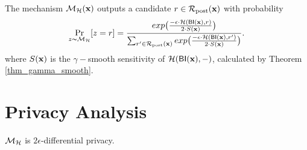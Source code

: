 \documentclass{article}
\begin{document}
\begin{definition}
\label{def_smoo}
The mechanism $\mathcal{M}_{\mathcal{H}}(\textbf{x})$ outputs a candidate $r \in \mathcal{R}_{\textup{post}}(\textbf{x})$ with probability
\begin{equation*}
\underset{z \thicksim \mathcal{M}_{\mathcal{H}}}{\Pr}[z=r] = \frac {exp\big(\frac{-\epsilon\cdot\mathcal{H}(\mathsf{BI}(\textbf{x}),r)}{2\cdot S(\textbf{x})}\big)}
{\sum_{r'\in \mathcal{R}_{\textup{post}}(\textbf{x})} exp \big(\frac{-\epsilon\cdot \mathcal{H} (\mathsf{BI}(\textbf{x}),r')}{2 \cdot S(\textbf{x})}\big)}.
\end{equation*}
where $S(\textbf{x})$ is the $\gamma -$smooth sensitivity of $\mathcal{H}(\mathsf{BI}(\textbf{x}),-)$, calculated by Theorem \ref{thm_gamma_smooth}.
\end{definition}

\section{Privacy Analysis}

\begin{lem}
\label{lem_hexpmech_privacy}
$\mathcal{M}_{\mathcal{H}}$ is $2\epsilon$-differential privacy.
\end{lem}
\end{document}

